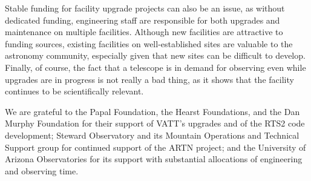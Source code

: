 \documentclass[]{spie}  %
\begin{document}
Stable funding for facility upgrade projects can also be an issue, as without dedicated funding, engineering staff are responsible for both upgrades and maintenance on multiple facilities. Although new facilities are attractive to funding sources, existing facilities on well-established sites are valuable to the astronomy community, especially given that new sites can be difficult to develop.
Finally, of course, the fact that a telescope is in demand for observing even while upgrades are in progress is not really a bad thing, as it shows that the facility continues to be scientifically relevant.





\acknowledgments %
 
We are grateful to the Papal Foundation, the Hearst Foundations, and the Dan Murphy Foundation for their support of VATT's upgrades and of the RTS2 code development; Steward Observatory and its Mountain Operations and Technical Support group for continued support of the ARTN project; and the University of Arizona Observatories for its support with substantial allocations of engineering and observing time.

\end{document}
